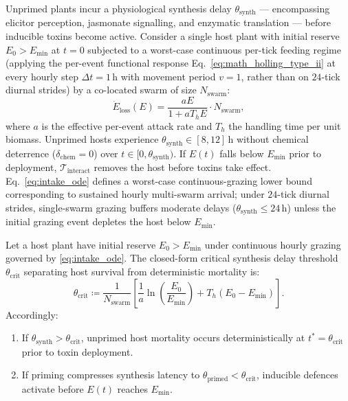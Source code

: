 Unprimed plants incur a physiological synthesis delay $\theta_{\mathrm{synth}}$ --- encompassing elicitor perception, jasmonate signalling, and enzymatic translation --- before inducible toxins become active. Consider a single host plant with initial reserve $E_0 > E_{\min}$ at $t = 0$ subjected to a worst-case continuous per-tick feeding regime (applying the per-event functional response Eq.~\eqref{eq:math_holling_type_ii} at every hourly step $\Delta t = 1\,\text{h}$ with movement period $v = 1$, rather than on $24$-tick diurnal strides) by a co-located swarm of size $N_{\mathrm{swarm}}$:
\begin{equation}
  \dot{E}_{\mathrm{loss}}(E) = \frac{a E}{1 + a T_h E} \cdot N_{\mathrm{swarm}},
  \label{eq:intake_ode}
\end{equation}
where $a$ is the effective per-event attack rate and $T_h$ the handling time per unit biomass. Unprimed hosts experience $\theta_{\mathrm{synth}} \in [8, 12]\,\text{h}$ without chemical deterrence ($\delta_{\mathrm{chem}} = 0$) over $t \in [0, \theta_{\mathrm{synth}})$. If $E(t)$ falls below $E_{\min}$ prior to deployment, $\mathcal{T}_{\text{interact}}$ removes the host before toxins take effect. Eq.~\eqref{eq:intake_ode} defines a worst-case continuous-grazing lower bound corresponding to sustained hourly multi-swarm arrival; under $24$-tick diurnal strides, single-swarm grazing buffers moderate delays ($\theta_{\mathrm{synth}} \le 24\,\text{h}$) unless the initial grazing event depletes the host below $E_{\min}$.

\begin{proposition}
\label{thm:critical_synthesis_delay}
Let a host plant have initial reserve $E_0 > E_{\min}$ under continuous hourly grazing governed by \eqref{eq:intake_ode}. The closed-form critical synthesis delay threshold $\theta_{\mathrm{crit}}$ separating host survival from deterministic mortality is:
\begin{equation}
  \theta_{\mathrm{crit}} \coloneqq \frac{1}{N_{\mathrm{swarm}}} \left[ \frac{1}{a} \ln\left(\frac{E_0}{E_{\min}}\right) + T_h (E_0 - E_{\min}) \right].
  \label{eq:theta_crit_exact}
\end{equation}
Accordingly:
\begin{enumerate}
  \item If $\theta_{\mathrm{synth}} > \theta_{\mathrm{crit}}$, unprimed host mortality occurs deterministically at $t^* = \theta_{\mathrm{crit}}$ prior to toxin deployment.
  \item If priming compresses synthesis latency to $\theta_{\mathrm{primed}} < \theta_{\mathrm{crit}}$, inducible defences activate before $E(t)$ reaches $E_{\min}$.
\end{enumerate}
\end{proposition}


